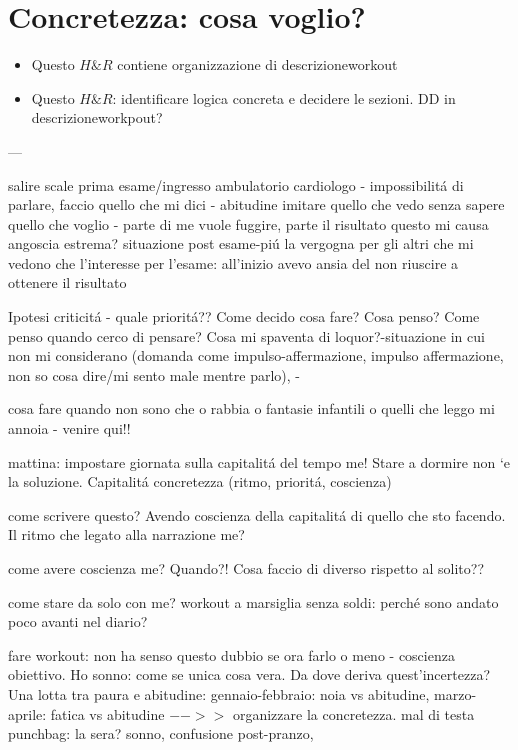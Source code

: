 {\let\clearpage\relax
\chapter{Concretezza: cosa voglio?}
}

\begin{itemize}
    \item Questo $H\&R$ contiene organizzazione di descrizioneworkout
    \item Questo $H\&R$: identificare logica concreta e decidere le sezioni. DD in descrizioneworkpout?
\end{itemize}

---

salire scale prima esame/ingresso ambulatorio cardiologo - impossibilit\'a di parlare, faccio quello che mi dici - abitudine imitare quello che vedo senza sapere quello che voglio - parte di me vuole fuggire, parte il risultato questo mi causa angoscia estrema?
situazione post esame-pi\'u la vergogna per gli altri che mi vedono che l'interesse per l'esame: all'inizio avevo ansia del non riuscire a ottenere il risultato

Ipotesi criticit\'a - quale priorit\'a?? Come decido cosa fare? Cosa penso? Come penso quando cerco di pensare? Cosa mi spaventa di loquor?-situazione in cui non mi considerano (domanda come impulso-affermazione, impulso affermazione, non so cosa dire/mi sento male mentre parlo), -

cosa fare quando non sono che o rabbia o fantasie infantili o quelli che leggo mi annoia - venire qui!!

mattina: impostare giornata sulla capitalit\'a del tempo me! Stare a dormire non ‘e la soluzione. Capitalit\'a concretezza (ritmo, priorit\'a, coscienza)

come scrivere questo? Avendo coscienza della capitalit\'a di quello che sto facendo.
Il ritmo che legato alla narrazione me?

come avere coscienza me? Quando?! Cosa faccio di diverso rispetto al solito??
 
come stare da solo con me? workout a marsiglia senza soldi: perch\'e sono andato poco avanti nel diario?

fare workout: non ha senso questo dubbio se ora farlo o meno - coscienza obiettivo. Ho sonno: come se unica cosa vera. Da dove deriva quest'incertezza?
Una lotta tra paura e abitudine: gennaio-febbraio: noia vs abitudine, marzo-aprile: fatica vs abitudine $-->>$ organizzare la concretezza.
mal di testa punchbag: la sera?
sonno, confusione post-pranzo,

